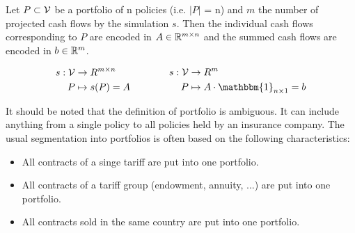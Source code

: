 \begin{definition}
	Let $P \subset \mathcal{V}$ be a portfolio of n policies (i.e. $\vert P \vert$ = n) and $m$ the number of projected cash flows by the simulation $s$. Then the individual cash flows corresponding to $P$ are encoded in $A \in \mathbb{R}^{m \times n}$ and the summed cash flows are encoded in $b \in \mathbb{R}^m$.

	\begin{equation*}
	\begin{aligned}[c]
	s: \V &\rightarrow R^{m \times n}\\
		P & \mapsto s(P)=A\\
	\end{aligned}
	\qquad \qquad
	\begin{aligned}[c]
	s: \V &\rightarrow R^m\\
		P & \mapsto A \cdot \mathbbm{1}_{n \times 1} = b \\
	\end{aligned}
	\end{equation*}
	
\end{definition}

\begin{remark}
	It should be noted that the definition of portfolio is ambiguous. It can include anything from a single policy to all policies held by an insurance company. The usual segmentation into portfolios is often based on the following characteristics:
	\begin{itemize}
		\item All contracts of a singe tariff are put into one portfolio.
		\item All contracts of a tariff group (endowment, annuity,  ...) are put into one portfolio. 
		\item All contracts sold in the same country are put into one portfolio.
	\end{itemize} 
\end{remark}

